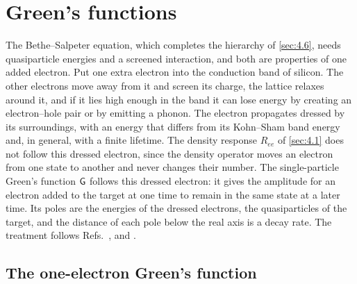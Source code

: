 \section{Green's functions}\label{sec:4.7}

The Bethe--Salpeter equation, which completes the hierarchy of \cref{sec:4.6}, needs quasiparticle energies and a screened interaction, and both are properties of one added electron. Put one extra electron into the conduction band of silicon. The other electrons move away from it and screen its charge, the lattice relaxes around it, and if it lies high enough in the band it can lose energy by creating an electron--hole pair or by emitting a phonon. The electron propagates dressed by its surroundings, with an energy that differs from its Kohn--Sham band energy and, in general, with a finite lifetime. The density response $R_{ee}$ of \cref{sec:4.1} does not follow this dressed electron, since the density operator moves an electron from one state to another and never changes their number. The single-particle Green's function $\mathsf{G}$ follows this dressed electron: it gives the amplitude for an electron added to the target at one time to remain in the same state at a later time. Its poles are the energies of the dressed electrons, the quasiparticles of the target, and the distance of each pole below the real axis is a decay rate. The treatment follows Refs.~\cite{bruus2004many}, \cite[Chaps.~3 and 7]{fetter1971quantum} and \cite[Chaps.~2 and 3]{mahan2000many}.

\subsection{The one-electron Green's function}

